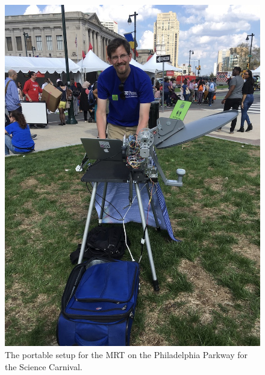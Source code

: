 \documentclass[11pt,letterpaper]{spie}
\begin{document}
\begin{figure}[h]
\centering
\includegraphics[width=6.5in]{PSFPortable.jpg}
\vspace{5pt}
\caption{The portable setup for the MRT on the Philadelphia Parkway for the Science Carnival.}
\label{fig:Devices}
\end{figure}
\end{document}
